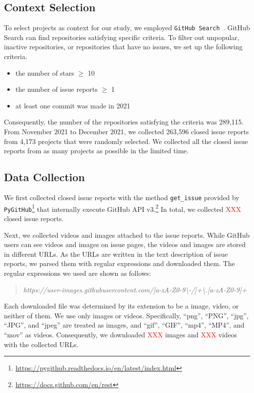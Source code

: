 \subsection{Context Selection}
\label{sec:design:context}
To select projects as context for our study, we employed \texttt{GitHub Search}~\citep{msr2021data}. GitHub Search can find repositories satisfying specific criteria. To filter out unpopular, inactive repositories, or repositories that have no issues, we set up the following criteria.
\begin{itemize}
	\item the number of stars $\geq$ 10
	\item the number of issue reports $\geq$ 1
	\item at least one commit was made in 2021
\end{itemize}
Consequently, the number of the repositories satisfying the criteria was 289,115. From November 2021 to December 2021, we collected 263,596 closed issue reports from 4,173 projects that were randomly selected. 
We collected all the closed issue reports from as many projects as possible in the limited time.  



% 

\subsection{Data Collection}
We first collected closed issue reports with the method \texttt{get\_issue} provided by  \texttt{PyGitHub}\footnote{\url{https://pygithub.readthedocs.io/en/latest/index.html}} that internally execute GitHub API v3.\footnote{\url{https://docs.github.com/en/rest}} In total, we collected \textcolor{red}{XXX} closed issue reports. 

Next, we collected videos and images attached to the issue reports. While GitHub users can see videos and images on issue pages, the videos and images are stored in different URLs. As the URLs are written in the text description of issue reports, we parsed them with regular expressions and downloaded them. The regular expressions we used are shown as follows:
\begin{quote}
\addtolength\leftmargini{0in}
{\it https://user-images.githubusercontent.com/[a-zA-Z0-9\textbackslash-/]+\textbackslash.[a-zA-Z0-9]+}
\end{quote}
Each downloaded file was determined by its extension to be a image, video, or neither of them. We use only images or videos. Specifically, ``png'', ``PNG'', ``jpg'', ``JPG'', and ``jpeg'' are treated as images, and  ``gif'', ``GIF'', ``mp4'', ``MP4'', and ``mov'' as videos. 
Consequently, we downloaded \textcolor{red}{XXX} images and \textcolor{red}{XXX} videos with the collected URLs. 

